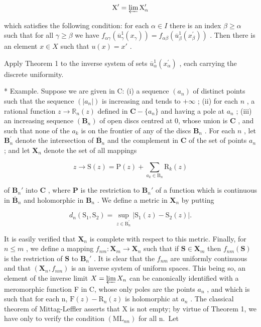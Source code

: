 \[
\mathrm{X} ^ {\prime} = \varprojlim \mathrm{X} _ {\alpha} ^ {\prime}
\]

which satisfies the following condition: for each \(\alpha \in I\) there is an index \(\beta \geqslant \alpha\) such that for all \(\gamma \geqslant \beta\) we have \(f_{\alpha \gamma}(\overline{u}_{\gamma}^{1}(x_{\gamma})) = f_{\alpha \beta}(\overline{u}_{\beta}^{1}(x_{\beta}^{\prime}))\) . Then there is an element \(x \in X\) such that \(u(x) = x'\) .

Apply Theorem 1 to the inverse system of sets \(\overline{u}_{\alpha}^{1}(x_{\alpha}^{\prime})\) , each carrying the discrete uniformity.

* Example. Suppose we are given in C: (i) a sequence \((a_{n})\) of distinct points such that the sequence \((|a_{n}|)\) is increasing and tends to \(+\infty\) ; (ii) for each \(n\) , a rational function \(z \to \mathbb{R}_{n}(z)\) defined in \(\mathbf{C} - \{a_{n}\}\) and having a pole at \(a_{n}\) ; (iii) an increasing sequence \((\mathbf{B}_{n})\) of open discs centred at 0, whose union is \(\mathbf{C}\) , and such that none of the \(a_{k}\) is on the frontier of any of the discs \(\mathbf{B}_{n}\) . For each \(n\) , let \(\mathbf{B}_{n}^{\prime}\) denote the intersection of \(\overline{\mathbf{B}}_{n}\) and the complement in \(\mathbf{C}\) of the set of points \(a_{n}\) ; and let \(\mathbf{X}_{n}\) denote the set of all mappings

\[
z \rightarrow \mathrm{S} (z) = \mathrm{P} (z) + \sum_ {a _ {k} \in \mathrm{B} _ {n}} \mathrm{R} _ {k} (z)
\]

of \(\mathbf{B}_n'\) into \(\mathbf{C}\) , where \(\mathbf{P}\) is the restriction to \(\mathbf{B}_n'\) of a function which is continuous in \(\overline{\mathbf{B}}_n\) and holomorphic in \(\mathbf{B}_n\) . We define a metric in \(\mathbf{X}_n\) by putting

\[
d _ {n} \left(\mathrm{S} _ {1}, \mathrm{S} _ {2}\right) = \sup _ {z \in \mathrm{B} _ {n} ^ {\prime}} | \mathrm{S} _ {1} (z) - \mathrm{S} _ {2} (z) |.
\]

It is easily verified that \(\mathbf{X}_n\) is complete with respect to this metric. Finally, for \(n \leqslant m\) , we define a mapping \(f_{nm}: \mathbf{X}_m \to \mathbf{X}_n\) such that if \(\mathbf{S} \in \mathbf{X}_m\) then \(f_{nm}(\mathbf{S})\) is the restriction of \(\mathbf{S}\) to \(\mathbf{B}_n'\) . It is clear that the \(f_{nm}\) are uniformly continuous and that \((\mathbf{X}_n, f_{nm})\) is an inverse system of uniform spaces. This being so, an element of the inverse limit \(X = \varprojlim X_{n}\) can be canonically identified with a meromorphic function F in C, whose only poles are the points \(a_{n}\) , and which is such that for each n, \(\mathrm{F}(z) - \mathrm{R}_{n}(z)\) is holomorphic at \(a_{n}\) . The classical theorem of Mittag-Leffler asserts that X is not empty; by virtue of Theorem 1, we have only to verify the condition \((\mathrm{ML}_{nn})\) for all n.~Let

